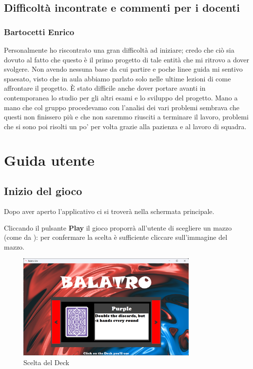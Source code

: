 \documentclass[a4paper,12pt]{report}
\begin{document}
\section{Difficoltà incontrate e commenti per i docenti}

\subsection{Bartocetti Enrico}
Personalmente ho riscontrato una gran difficoltà ad iniziare; credo che ciò sia dovuto al fatto che questo è il primo progetto di tale entità che mi ritrovo a dover svolgere.
Non avendo nessuna base da cui partire e poche linee guida mi sentivo spaesato, visto che in aula abbiamo parlato solo nelle ultime lezioni di come affrontare il progetto.
È stato difficile anche dover portare avanti in contemporanea lo studio per gli altri esami e lo sviluppo del progetto.
Mano a mano che col gruppo procedevamo con l'analisi dei vari problemi sembrava che questi non finissero più e che non saremmo riusciti a terminare il lavoro, problemi che si sono poi risolti un po' per volta grazie alla pazienza e al lavoro di squadra.

\appendix
\chapter{Guida utente}

\section{Inizio del gioco}

Dopo aver aperto l'applicativo ci si troverà nella schermata principale.

Cliccando il pulsante  \textbf{Play} il gioco proporrà all'utente di scegliere un mazzo (come da ): per confermare la scelta è sufficiente cliccare sull'immagine del mazzo.

\begin{figure}[H]
	\centering{}
	\includegraphics[width=0.8\textwidth]{img/guida/02-DeckChoice}
	\caption{Scelta del Deck}
	\label{img:guida:deck}
\end{figure}
\end{document}

